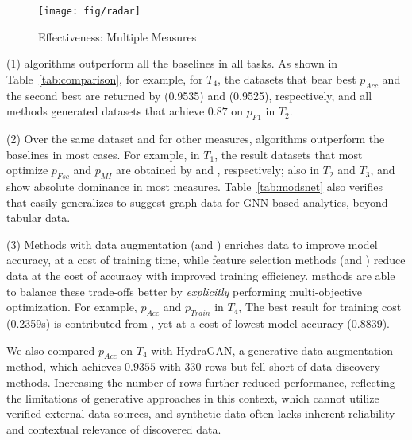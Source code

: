 \begin{figure}[tb!]
\vspace{-2ex}
\centerline{\texttt{[image: fig/radar]}}
\centering
\vspace{-1ex}
\caption{Effectiveness: Multiple Measures}
\vspace{-3ex}
\label{fig:mo-eff}
\end{figure}

\sstab
(1) \modis algorithms outperform all the baselines in all tasks. 
As shown in Table~\ref{tab:comparison}, for example, for $T_4$, the datasets that bear best $p_{Acc}$ and the second best are returned by \apxmodis (0.9535) and \bimodis (0.9525), respectively, and all \modis methods generated datasets that achieve $0.87$ on $p_{F1}$ in $T_2$. 

\sstab
(2) Over the same dataset and for other measures, \modis algorithms outperform the baselines in most cases. 
For example, in $T_1$, the result datasets that most optimize $p_{Fsc}$ and $p_{MI}$ are obtained by \bimodis and \apxmodis, respectively; also in $T_2$  and $T_3$, \nomodis and \bimodis show absolute dominance in most measures. 
Table~\ref{tab:modsnet} also verifies 
that \modis easily generalizes to suggest 
graph data for GNN-based analytics, beyond tabular data.  

\sstab
(3) Methods with data  
augmentation (\eg \metam and \starmie) enriches 
data to improve model accuracy, at a cost of training time, while feature selection methods (\eg \sklearn and \ho) reduce data at the cost of accuracy with improved training efficiency. \modis 
methods are able to balance these trade-offs better 
by {\em explicitly} performing multi-objective optimization. 
For example, $p_{Acc}$ and $p_{Train}$ in $T_4$, The best result for training cost (0.2359s) 
is contributed from \sklearn, yet at a cost of 
lowest model accuracy (0.8839). 

We also compared $p_{Acc}$ on $T_4$ with HydraGAN, a generative data augmentation method, which achieves $0.9355$ with $330$ rows but fell short of data discovery methods. Increasing the number of rows further reduced performance, reflecting the limitations of generative approaches in this context, which cannot utilize verified external data sources, and synthetic data often lacks inherent reliability and contextual relevance of discovered data.

